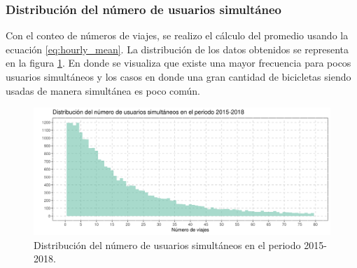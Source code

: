 \subsubsection{Distribución del número de usuarios simultáneo}

Con el conteo de números de viajes, se realizo el cálculo del promedio usando la ecuación \ref{eq:hourly_mean}. La distribución de los datos obtenidos se representa en la figura \ref{fig:distribution_count_travel}. En donde se visualiza que existe una mayor frecuencia para pocos usuarios simultáneos y los casos en donde una gran cantidad de bicicletas siendo usadas de manera simultánea es poco común.

\begin{figure}[H]
    \centering
    \includegraphics[width=16cm]{Graphics/distribution_count_travel.png}
    \caption{Distribución del número de usuarios simultáneos en el periodo 2015-2018.}
    \label{fig:distribution_count_travel}
\end{figure}